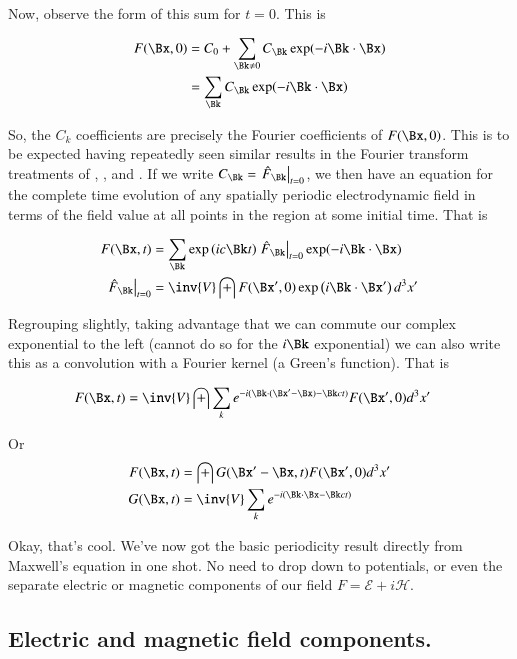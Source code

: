 \documentclass{article}
\newcommand{\EE}[0]{\boldsymbol{\mathcal{E}}}
\newcommand{\HH}[0]{\boldsymbol{\mathcal{H}}}
\begin{document}
Now, observe the form of this sum for $t=0$.  This is

\begin{align*}
F(\Bx,0) 
&= C_0 + \sum_{\Bk \ne 0} C_{\Bk} \exp(-i \Bk \cdot \Bx ) \\
&= \sum_{\Bk} C_{\Bk} \exp(-i \Bk \cdot \Bx ) \\
\end{align*}

So, the $C_k$ coefficients are precisely the Fourier coefficients of $F(\Bx,0)$.  This is to be expected having repeatedly seen similar results in the Fourier transform treatments of 
\cite{PJfourierMaxwellSecondOrder}, \cite{PJfirstOrderMaxwell}, and \cite{PJ4dFourier}.
If we write 
$
C_{\Bk}
=
{\left.\hat{F}_{\Bk}\right\vert}_{t=0}
$, we then have an equation for the complete time evolution of any spatially periodic electrodynamic field in terms of the field value at all points in the region at some initial time.  That is

\begin{align}
F(\Bx,t) &= \sum_{\Bk} \exp\left(i c \Bk t \right) {\left.\hat{F}_{\Bk}\right\vert}_{t=0} \exp(-i \Bk \cdot \Bx) \\
{\left.\hat{F}_{\Bk}\right\vert}_{t=0} &= \inv{V} \int F(\Bx', 0) \exp\left( i\Bk \cdot \Bx' \right) d^3 x'
\end{align}

Regrouping slightly, taking advantage that we can commute our complex exponential to the left (cannot do so for the $i\Bk$ exponential)
we can also write this as a convolution with a Fourier kernel (a Green's function).  That is

\begin{align}
F(\Bx,t) &= \inv{V} \int \sum_k e^{ - i (\Bk \cdot (\Bx' - \Bx) - \Bk c t) } F(\Bx', 0) d^3 x'
\end{align}

Or
\begin{align}
F(\Bx,t) &= \int G(\Bx' - \Bx, t) F(\Bx', 0) d^3 x' \\
G(\Bx,t) &= \inv{V} \sum_k e^{ - i (\Bk \cdot \Bx - \Bk c t) }
\end{align}

Okay, that's cool.  We've now got the basic periodicity result directly from Maxwell's equation in one shot.  No need to drop down to
potentials, or even the separate electric or magnetic components of our field $F = \EE + i \HH$.

\subsection{ Electric and magnetic field components. }
\end{document}
